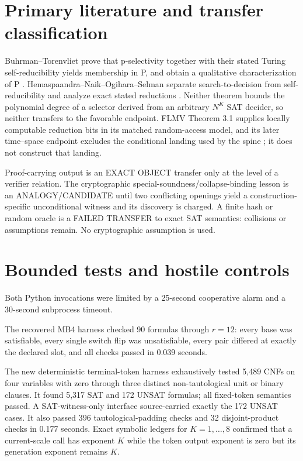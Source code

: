 \documentclass[11pt]{article}
\begin{document}
\section{Primary literature and transfer classification}
Buhrman--Torenvliet prove that p-selectivity together with their stated
Turing self-reducibility yields membership in P, and obtain a qualitative
characterization of P \cite{buhrman1996}.  Hemaspaandra--Naik--Ogihara--Selman
separate search-to-decision from self-reducibility and analyze exact stated
reductions \cite{hemaspaandra1996}.  Neither theorem bounds the polynomial
degree of a selector derived from an arbitrary $N^K$ SAT decider, so neither
transfers to the favorable endpoint.  FLMV Theorem 3.1 supplies locally
computable reduction bits in its matched random-access model, and its later
time--space endpoint excludes the conditional landing used by the spine
\cite{flmv}; it does not construct that landing.

Proof-carrying output is an EXACT OBJECT transfer only at the level of a
verifier relation.  The cryptographic special-soundness/collapse-binding
lesson is an ANALOGY/CANDIDATE until two conflicting openings yield a
construction-specific unconditional witness and its discovery is charged.
A finite hash or random oracle is a FAILED TRANSFER to exact SAT semantics:
collisions or assumptions remain.  No cryptographic assumption is used.

\section{Bounded tests and hostile controls}
Both Python invocations were limited by a 25-second cooperative alarm and a
30-second subprocess timeout.

The recovered MB4 harness checked 90 formulas through $r=12$: every base was
satisfiable, every single switch flip was unsatisfiable, every pair differed
at exactly the declared slot, and all checks passed in 0.039 seconds.

The new deterministic terminal-token harness exhaustively tested 5,489 CNFs
on four variables with zero through three distinct non-tautological unit or
binary clauses.  It found 5,317 SAT and 172 UNSAT formulas; all fixed-token
semantics passed.  A SAT-witness-only interface source-carried exactly the
172 UNSAT cases.  It also passed 396 tautological-padding checks and 32
disjoint-product checks in 0.177 seconds.  Exact symbolic ledgers for
$K=1,\ldots,8$ confirmed that a current-scale call has exponent $K$ while
the token output exponent is zero but its generation exponent remains $K$.
\end{document}
